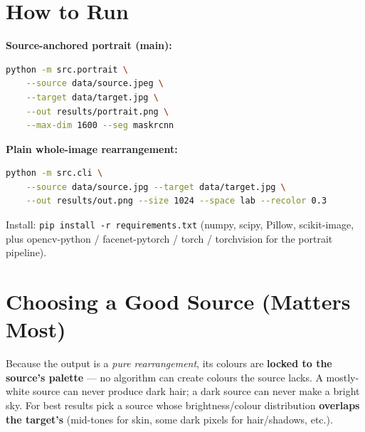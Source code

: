 \documentclass[11pt,a4paper]{article}
\begin{document}
\section{How to Run}
\textbf{Source-anchored portrait (main):}
\begin{lstlisting}[language=bash]
python -m src.portrait \
    --source data/source.jpeg \
    --target data/target.jpg \
    --out results/portrait.png \
    --max-dim 1600 --seg maskrcnn
\end{lstlisting}

\noindent\textbf{Plain whole-image rearrangement:}
\begin{lstlisting}[language=bash]
python -m src.cli \
    --source data/source.jpg --target data/target.jpg \
    --out results/out.png --size 1024 --space lab --recolor 0.3
\end{lstlisting}

\noindent
Install: \texttt{pip install -r requirements.txt} (numpy, scipy, Pillow, scikit-image, plus
opencv-python / facenet-pytorch / torch / torchvision for the portrait pipeline).

\section{Choosing a Good Source (Matters Most)}
Because the output is a \emph{pure rearrangement}, its colours are \textbf{locked to the
source's palette} --- no algorithm can create colours the source lacks. A mostly-white source
can never produce dark hair; a dark source can never make a bright sky. For best results pick a
source whose brightness/colour distribution \textbf{overlaps the target's} (mid-tones for skin,
some dark pixels for hair/shadows, etc.).

\end{document}
